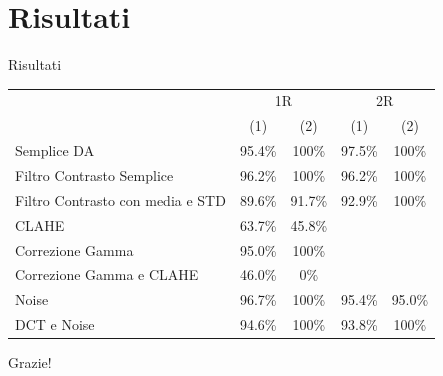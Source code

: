\documentclass[aspectratio=169]{beamer}
\begin{document}
\section{Risultati}
\begin{frame}{Risultati}
    \begin{table}[H]
        \centering
        \begin{tabular}{l|cc|cc}
                                         & \multicolumn{2}{c|}{1R}                                                   & \multicolumn{2}{c}{2R}                                                   \\
                                         & (1) & (2) & (1) & (2) \\ \midrule
        Semplice DA                      & 95.4\%                            & 100\%                                & 97.5\%                            & 100\%                                \\
        Filtro Contrasto Semplice        & 96.2\%                            & 100\%                                & 96.2\%                            & 100\%                                \\
        Filtro Contrasto con media e STD & 89.6\%                            & 91.7\%                               & 92.9\%                            & 100\%                                \\
        CLAHE                            & 63.7\%                            & 45.8\%                               &                                   &                                      \\
        Correzione Gamma                 & 95.0\%                            & 100\%                                &                                   &                                      \\
        Correzione Gamma e CLAHE         & 46.0\%                            & 0\%                                  &                                   &                                      \\
        Noise                            & 96.7\%                            & 100\%                                & 95.4\%                            & 95.0\%                               \\
        DCT e Noise                      & 94.6\%                            & 100\%                                & 93.8\%                            & 100\%                             
        \end{tabular}
    \end{table}
\end{frame}
\begin{frame}[c]{ }
    \centering
    Grazie!
    \end{frame}
\end{document}

